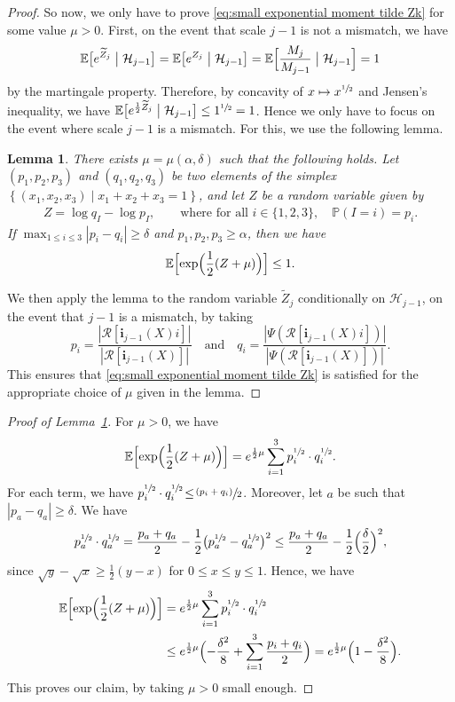 \documentclass[JEP,XML,SOM,Unicode,NoFloatCountersInSection,published]{cedram}
\newcommand{\psfrac}[2]{\sfrac{(#1)}{#2}}
\newcommand{\BEc}[1]{\mathbb{E} \Bigl[#1\Bigr]}
\newcommand{\Pp}[1]{\mathbb{P} \left(#1\right)}
\newcommand{\bEcsq}[2]{\mathbb{E} \bigl[#1\bigm| #2\bigr]}
\newcommand{\BEcsq}[2]{\mathbb{E} \Bigl[#1\bigm|#2\Bigr]}
\newcommand{\enstq}[2]{\left\lbrace#1\mathrel{}\middle|\mathrel{}#2\right\rbrace}
\newcommand{\Rr}{\mathcal{R}}
\newcommand{\ii}{\mathbf{i}}
\theoremstyle{plain}
\newtheorem{lemma}[theorem]{Lemma}
\theoremstyle{definition}
\begin{document}
\begin{proof}
So now, we only have to prove \eqref{eq:small exponential moment tilde Zk} for some value $\mu>0$.
First, on the event that scale $j-1$ is not a mismatch, we have
\begin{align*}
\bEcsq{e^{\widetilde Z_j}}{\mathcal H_{j-1}}= \bEcsq{e^{Z_j}}{\mathcal H_{j-1}}= \BEcsq{\frac{M_j}{M_{j-1}}}{\mathcal H_{j-1}}=1
\end{align*}
by the martingale property. Therefore, by concavity of $x\mapsto x^{\sfrac{1}{2}}$ and Jensen's inequality, we have $\bEcsq{e^{\frac12 \widetilde Z_j}}{\mathcal H_{j-1}}\leq 1^{\sfrac{1}{2}} =1$.
Hence we only have to focus on the event where scale $j-1$ is a mismatch.
For this, we use the following lemma.
\begin{lemma}\label{lem:small exponential moment for Z+c}
There exists $\mu=\mu(\alpha,\delta)$ such that the following holds.
Let $(p_1,p_2,p_3)$ and $(q_1,q_2,q_3)$ be two elements of the simplex $\enstq{(x_1,x_2,x_3)}{x_1+x_2+x_3=1}$, and let $Z$ be a random variable given by
\begin{align*}
Z= \log q_I - \log p_I,\qquad \text{where for all } i\in \{1,2,3\}, \quad \Pp{I=i}=p_i.
\end{align*}
If $\max_{1 \leq i \leq 3}|p_i-q_i| \geq \delta$ and $p_1,p_2,p_3\geq \alpha$,
then we have
\begin{align}
\BEc{\exp\Bigl(\frac{1}{2} (Z + \mu )\Bigr)}\leq 1.
\end{align}
\end{lemma}
We then apply the lemma to the random variable $\widetilde{Z}_j$ conditionally on $\mathcal{H}_{j-1}$, on the event that $j-1$ is a mismatch, by taking
\[
p_i= \frac{\left| \Rr[\ii_{j-1}(X)i] \right|}{\left| \Rr[\ii_{j-1}(X)] \right|}\quad\text{and}\quad q_i= \frac{\left| \Psi \left( \Rr[\ii_{j-1}(X)i] \right) \right|}{\left| \Psi \left( \Rr[\ii_{j-1}(X)] \right) \right|}.
\]
This ensures that \eqref{eq:small exponential moment tilde Zk} is satisfied for the appropriate choice of $\mu$ given in the lemma.
\end{proof}

\begin{proof}[Proof of Lemma~\ref{lem:small exponential moment for Z+c}]
For $\mu>0$, we have
\[ \BEc{\exp \Bigl( \frac12(Z+\mu)\Bigr)} = e^{\frac12 \mu} \sum_{i=1}^3 p_i^{\sfrac12}\cdot q_i^{\sfrac12}. \]
For each term, we have $p_i^{\sfrac12} \cdot q_i^{\sfrac12}\!\leq\! \psfrac{p_i+q_i}{2}$. Moreover, let $a$ be such that $|p_a-q_a|\!\geq\! \delta$. We have
\[ p_a^{\sfrac12} \cdot q_a^{\sfrac12} = \frac{p_a+q_a}{2} - \frac{1}{2} \bigl( p_a^{\sfrac12}-q_a^{\sfrac12} \bigr)^2 \leq \frac{p_a+q_a}{2} - \frac{1}{2} \Bigl( \frac{\delta}{2} \Bigr)^2,\]
since $\sqrt{y}-\sqrt{x} \geq \frac{1}{2}(y-x)$ for $0 \leq x \leq y \leq 1$. Hence, we have
\begin{align*}
\BEc{\exp \Bigl( \frac12(Z+\mu) \Bigr)} &= e^{\frac12 \mu} \sum_{i=1}^3 p_i^{\sfrac12} \cdot q_i^{\sfrac12}\\
& \leq e^{\frac12 \mu} \Bigl( -\frac{\delta^2}{8} + \sum_{i=1}^3 \frac{p_i+q_i}{2} \Bigr)= e^{\frac12 \mu} \Bigl( 1-\frac{\delta^2}{8} \Bigr).
\end{align*}
This proves our claim, by taking $\mu>0$ small enough.
\end{proof}
\end{document}
